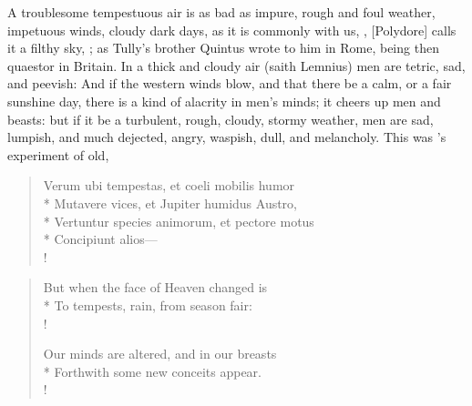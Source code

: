 {{A troublesome tempestuous air is as bad as impure, rough and foul
weather, impetuous winds, cloudy dark days, as it is commonly with us,
, [Polydore] calls it a filthy sky, ; as Tully's brother Quintus wrote to him in
Rome, being then quaestor in Britain. In a thick and cloudy air (saith
Lemnius) men are tetric, sad, and peevish: And if the western winds
blow, and that there be a calm, or a fair sunshine day, there is a kind
of alacrity in men's minds; it cheers up men and beasts: but if it be a
turbulent, rough, cloudy, stormy weather, men are sad, lumpish, and
much dejected, angry, waspish, dull, and melancholy. This was
\Virgil{}'s experiment of old,
%
\begin{latin}
\begin{verse}%
Verum ubi tempestas, et coeli mobilis humor\\*
Mutavere vices, et Jupiter humidus Austro,\\*
Vertuntur species animorum, et pectore motus\\*
Concipiunt alios---\\!
\end{verse}%
\end{latin}
\translationrule%
\begin{verse}%
But when the face of Heaven changed is\\*
To tempests, rain, from season fair:\\!

Our minds are altered, and in our breasts\\*
Forthwith some new conceits appear.\\!
\end{verse}%

}}
